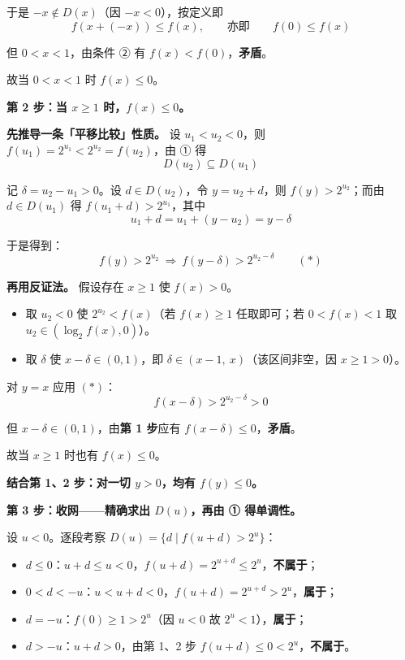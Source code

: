 于是 $-x\notin D(x)$（因 $-x<0$），按定义即
\[f\left(x+(-x)\right)\le f(x),\qquad\text{亦即}\qquad f(0)\le f(x)\]

但 $0<x<1$，由条件 ② 有 $f(x)<f(0)$，\textbf{矛盾}。

故当 $0<x<1$ 时 $f(x)\le0$。

\par\medskip

\textbf{第 2 步：当 $x\ge1$ 时，$f(x)\le0$。}

\textbf{先推导一条「平移比较」性质。} 设 $u_1<u_2<0$，则 $f(u_1)=2^{u_1}<2^{u_2}=f(u_2)$，由 ① 得
\[D(u_2)\subseteq D(u_1)\]

记 $\delta=u_2-u_1>0$。设 $d\in D(u_2)$，令 $y=u_2+d$，则 $f(y)>2^{u_2}$；而由 $d\in D(u_1)$ 得 $f(u_1+d)>2^{u_1}$，其中
\[u_1+d=u_1+\left(y-u_2\right)=y-\delta\]

于是得到：
\[\boxed{f(y)>2^{u_2}\ \Longrightarrow\ f(y-\delta)>2^{u_2-\delta}}\qquad(\ast)\]

\textbf{再用反证法。} 假设存在 $x\ge1$ 使 $f(x)>0$。

\begin{itemize}
\item 取 $u_2<0$ 使 $2^{u_2}<f(x)$（若 $f(x)\ge1$ 任取即可；若 $0<f(x)<1$ 取 $u_2\in\left(\log_2f(x),0\right)$）。
\item 取 $\delta$ 使 $x-\delta\in(0,1)$，即 $\delta\in\left(x-1,\ x\right)$（该区间非空，因 $x\ge1>0$）。
\end{itemize}

对 $y=x$ 应用 $(\ast)$：
\[f(x-\delta)>2^{u_2-\delta}>0\]

但 $x-\delta\in(0,1)$，由\textbf{第 1 步}应有 $f(x-\delta)\le0$，\textbf{矛盾}。

故当 $x\ge1$ 时也有 $f(x)\le0$。

\textbf{结合第 1、2 步：对一切 $y>0$，均有 $f(y)\le0$。}

\par\medskip

\textbf{第 3 步：收网——精确求出 $D(u)$，再由 ① 得单调性。}

设 $u<0$。逐段考察 $D(u)=\{d\mid f(u+d)>2^{u}\}$：

\begin{itemize}
\item $d\le0$：$u+d\le u<0$，$f(u+d)=2^{u+d}\le2^{u}$，\textbf{不属于}；
\item $0<d<-u$：$u<u+d<0$，$f(u+d)=2^{u+d}>2^{u}$，\textbf{属于}；
\item $d=-u$：$f(0)\ge1>2^{u}$（因 $u<0$ 故 $2^u<1$），\textbf{属于}；
\item $d>-u$：$u+d>0$，由第 1、2 步 $f(u+d)\le0<2^{u}$，\textbf{不属于}。
\end{itemize}

